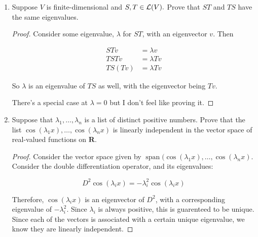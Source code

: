 \begin{enumerate}
\begin{proof}
        \begin{align*}
        \lambda |a_i| &= |\sum_{j = 1}^n \M(T)_{i, j}a_j| \\
        \lambda &\le \sum_{j = 1}^n \M(T)_{i, j} \frac{|a_j|}{|a_i|} \\
        &\le \sum_{j=1}^n |\M(T)_{i, j}| \\
        &\le n \max\{|\M(T)_{j, k}|: 1 \le j, k \le n\}
        \end{align*}

        Triangle equality is used here, on the second step.
    \end{proof}

    \item[23] Suppose $V$ is finite-dimensional and $S, T \in \mathcal L(V).$ Prove that $ST$ and $TS$ have the same eigenvalues.
    
    \begin{proof}
        Consider some eigenvalue, $\lambda$ for $ST$, with an eigenvector $v$. Then

        \begin{align*}
            STv &= \lambda v \\
            TSTv &= \lambda Tv \\
            TS(Tv) &= \lambda Tv 
        \end{align*}

        So $\lambda$ is an eigenvalue of $TS$ as well, with the eigenvector being $Tv$.

        There's a special case at $\lambda = 0$ but I don't feel like proving it.
    \end{proof}

    \item[36] Suppose that $\lambda_1, \dots, \lambda_n$ is a list of distinct positive numbers. Prove that the
list $\cos(\lambda_1 x), \dots, \cos(\lambda_n x)$ is linearly independent in the vector space of
real-valued functions on $\mathbf{R}$.

    \begin{proof}
Consider the vector space given by $\operatorname{span}(\cos(\lambda_1 x), \dots, \cos(\lambda_n x)$. Consider the double differentiation operator, and its eigenvalues:

$$D^2\cos(\lambda_i x) = -\lambda_i^2\cos(\lambda_i x)$$

Therefore, $\cos(\lambda_i x)$ is an eigenvector of $D^2$, with a corresponding eigenvalue of $-\lambda_i^2$. Since $\lambda_i$ is always positive, this is guarenteed to be unique. Since each of the vectors is associated with a certain unique eigenvalue, we know they are linearly independent.


\end{proof}
\end{enumerate}
